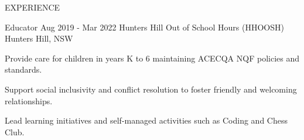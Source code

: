 \begin{ResumeSection}{EXPERIENCE}
    \begin{DatedField}
        {Educator}
        {Aug 2019 - Mar 2022}
        {Hunters Hill Out of School Hours (HHOOSH)}
        {Hunters Hill, NSW}
        \item Provide care for children in years K to 6 maintaining ACECQA NQF policies and standards.
        \item Support social inclusivity and conflict resolution to foster friendly and welcoming relationships.
        \item Lead learning initiatives and self-managed activities such as Coding and Chess Club.
    \end{DatedField}

\end{ResumeSection} 